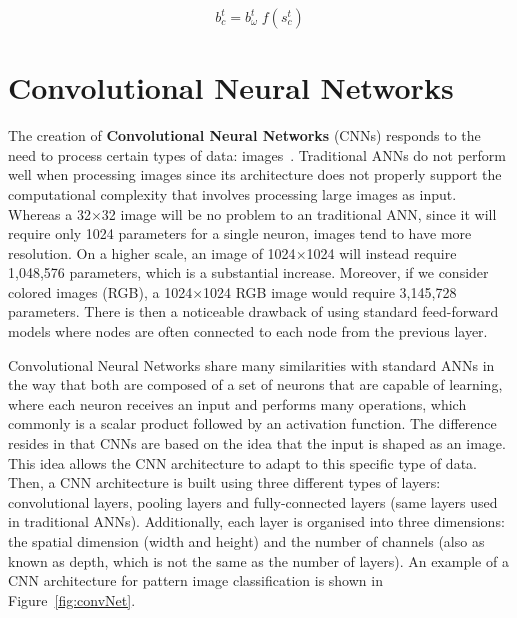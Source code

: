 \begin{equation} \label{eq:cellOutput}
    b_c^t = b_\omega^t \; f(s_c^t)
\end{equation}


\section{Convolutional Neural Networks}
\label{appendix:convolutionalNN}
The creation of \textbf{Convolutional Neural Networks} (CNNs) responds to the need to process 
certain types of data: images~\cite{appendix:OSheaN15}. Traditional ANNs do not perform well 
when processing images since its architecture does not properly support the computational 
complexity that involves processing large images as input. Whereas a 32$\times$32 image will 
be no problem to an traditional ANN, since it will require only 1024 parameters for a single 
neuron, images tend to have more resolution. On a higher scale, an image of 1024$\times$1024 
will instead require 1,048,576 parameters, which is a substantial increase. Moreover, if we 
consider colored images (RGB), a 1024$\times$1024 RGB image would require 3,145,728 
parameters. There is then a noticeable drawback of using standard feed-forward models where 
nodes are often connected to each node from the previous layer.

Convolutional Neural Networks share many similarities with standard ANNs in the way that both 
are composed of a set of neurons that are capable of learning, where each neuron receives an 
input and performs many operations, which commonly is a scalar product followed by an 
activation function. The difference resides in that CNNs are based on the idea that the input 
is shaped as an image. This idea allows the CNN architecture to adapt to this specific type 
of data. Then, a CNN architecture is built using three different types of layers: 
convolutional layers, pooling layers and fully-connected layers (same layers used in 
traditional ANNs). Additionally, each layer is organised into three dimensions: the spatial 
dimension (width and height) and the number of channels (also as known as depth, which is not 
the same as the number of layers). An example of a CNN architecture for pattern image 
classification is shown in Figure~\ref{fig:convNet}.

